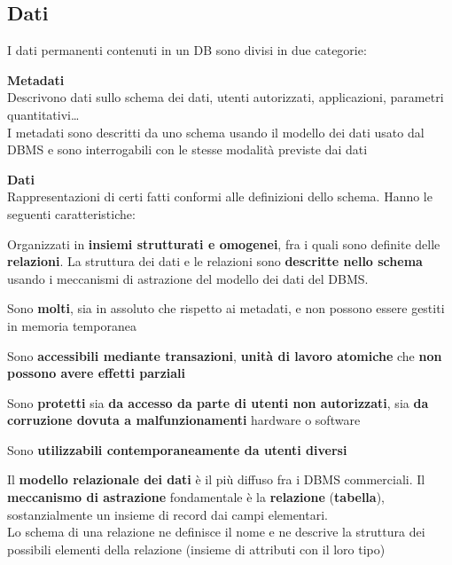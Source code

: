 \documentclass[10pt]{book}
\begin{document}
\subsection{Dati}
I dati permanenti contenuti in un DB sono divisi in due categorie:
\begin{list}{}{}
	\item \textbf{Metadati}\\
	Descrivono dati sullo schema dei dati, utenti autorizzati, applicazioni, parametri quantitativi\ldots\\
	I metadati sono descritti da uno schema usando il modello dei dati usato dal DBMS e sono interrogabili con le stesse modalità previste dai dati
	\item \textbf{Dati}\\
	Rappresentazioni di certi fatti conformi alle definizioni dello schema. Hanno le seguenti caratteristiche:
	\begin{list}{}{}
		\item Organizzati in \textbf{insiemi strutturati e omogenei}, fra i quali sono definite delle \textbf{relazioni}. La struttura dei dati e le relazioni sono \textbf{descritte nello schema} usando i meccanismi di astrazione del modello dei dati del DBMS.
		\item Sono \textbf{molti}, sia in assoluto che rispetto ai metadati, e non possono essere gestiti in memoria temporanea
		\item Sono \textbf{accessibili mediante transazioni}, \textbf{unità di lavoro atomiche} che \textbf{non possono avere effetti parziali}
		\item Sono \textbf{protetti} sia \textbf{da accesso da parte di utenti non autorizzati}, sia \textbf{da corruzione dovuta a malfunzionamenti} hardware o software
		\item Sono \textbf{utilizzabili contemporaneamente da utenti diversi}
	\end{list}
\end{list}
Il \textbf{modello relazionale dei dati} è il più diffuso fra i DBMS commerciali. Il \textbf{meccanismo di astrazione} fondamentale è la \textbf{relazione} (\textbf{tabella}), sostanzialmente un insieme di record dai campi elementari.\\
Lo schema di una relazione ne definisce il nome e ne descrive la struttura dei possibili elementi della relazione (insieme di attributi con il loro tipo)
\end{document}
